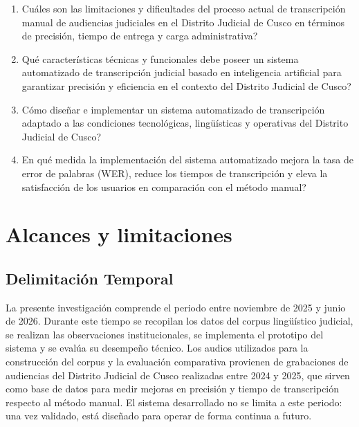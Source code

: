 \documentclass[12pt,a4paper,oneside]{article}
\begin{document}
\begin{enumerate}[label=\alph*)]
  \item \textquestiondown Cu\'ales son las limitaciones y dificultades del proceso actual de transcripci\'on manual de audiencias judiciales en el Distrito Judicial de Cusco en t\'erminos de precisi\'on, tiempo de entrega y carga administrativa?
  \item \textquestiondown Qu\'e caracter\'isticas t\'ecnicas y funcionales debe poseer un sistema automatizado de transcripci\'on judicial basado en inteligencia artificial para garantizar precisi\'on y eficiencia en el contexto del Distrito Judicial de Cusco?
  \item \textquestiondown C\'omo dise\~nar e implementar un sistema automatizado de transcripci\'on adaptado a las condiciones tecnol\'ogicas, ling\"u\'isticas y operativas del Distrito Judicial de Cusco?
  \item \textquestiondown En qu\'e medida la implementaci\'on del sistema automatizado mejora la tasa de error de palabras (WER), reduce los tiempos de transcripci\'on y eleva la satisfacci\'on de los usuarios en comparaci\'on con el m\'etodo manual?
\end{enumerate}


\section{Alcances y limitaciones}

\subsection{Delimitaci\'on Temporal}

La presente investigaci\'on comprende el periodo entre noviembre de 2025 y junio de 2026. Durante este tiempo se recopilan los datos del corpus ling\"u\'istico judicial, se realizan las observaciones institucionales, se implementa el prototipo del sistema y se eval\'ua su desempe\~no t\'ecnico. Los audios utilizados para la construcci\'on del corpus y la evaluaci\'on comparativa provienen de grabaciones de audiencias del Distrito Judicial de Cusco realizadas entre 2024 y 2025, que sirven como base de datos para medir mejoras en precisi\'on y tiempo de transcripci\'on respecto al m\'etodo manual. El sistema desarrollado no se limita a este periodo: una vez validado, est\'a dise\~nado para operar de forma continua a futuro.
\end{document}
